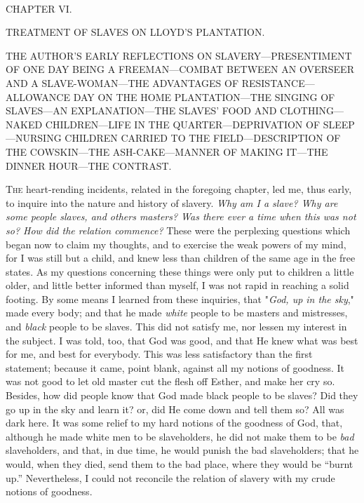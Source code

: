{\protect\hypertarget{89}{}{}}

~

{CHAPTER VI.}

TREATMENT OF SLAVES ON LLOYD'S PLANTATION.

{THE AUTHOR'S EARLY REFLECTIONS ON SLAVERY---PRESENTIMENT OF ONE DAY
BEING A FREEMAN---COMBAT BETWEEN AN OVERSEER AND A SLAVE-WOMAN---THE
ADVANTAGES OF RESISTANCE---ALLOWANCE DAY ON THE HOME PLANTATION---THE
SINGING OF SLAVES---AN EXPLANATION---THE SLAVES' FOOD AND
CLOTHING---NAKED CHILDREN---LIFE IN THE QUARTER---DEPRIVATION OF
SLEEP---NURSING CHILDREN CARRIED TO THE FIELD---DESCRIPTION OF THE
COWSKIN---THE ASH-CAKE---MANNER OF MAKING IT---THE DINNER HOUR---THE
CONTRAST.}

\textsc{The} heart-rending incidents, related in the foregoing chapter,
led me, thus early, to inquire into the nature and history of slavery.
\emph{Why am I a slave? Why are some people slaves, and others masters?
Was there ever a time when this was not so? How did the relation
commence?} These were the perplexing questions which began now to claim
my thoughts, and to exercise the weak powers of my mind, for I was still
but a child, and knew less than children of the same age in the free
states. As my questions concerning these things were only put to
children a little older, and little better informed than myself, I was
not rapid in reaching a solid footing. By some means I learned from
these inquiries, that "\emph{God, up in the sky}," made every body; and
that he made \emph{white} people to be masters and mistresses, and
\emph{black} people to be slaves. This did not satisfy me, nor lessen my
interest in the subject. I was told, too,
{\protect\hypertarget{90}{}{}}that God was good, and that He knew what
was best for me, and best for everybody. This was less satisfactory than
the first statement; because it came, point blank, against all my
notions of goodness. It was not good to let old master cut the flesh off
Esther, and make her cry so. Besides, how did people know that God made
black people to be slaves? Did they go up in the sky and learn it? or,
did He come down and tell them so? All was dark here. It was some relief
to my hard notions of the goodness of God, that, although he made white
men to be slaveholders, he did not make them to be \emph{bad}
slaveholders, and that, in due time, he would punish the bad
slaveholders; that he would, when they died, send them to the bad place,
where they would be ``burnt up.'' Nevertheless, I could not reconcile
the relation of slavery with my crude notions of goodness.

